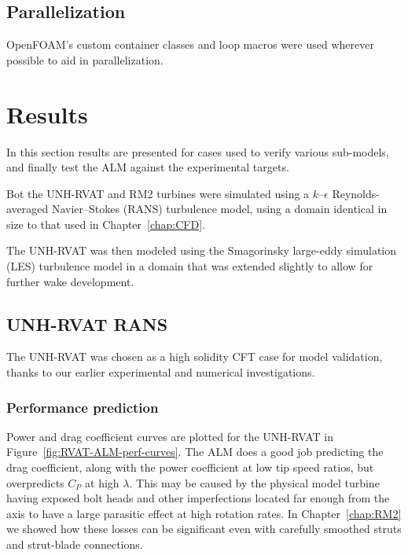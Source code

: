 \subsection{Parallelization}

OpenFOAM's custom container classes and loop macros were used wherever possible
to aid in parallelization.


\section{Results}

In this section results are presented for cases used to verify various
sub-models, and finally test the ALM against the experimental targets.


Bot the UNH-RVAT and RM2 turbines were simulated using a $k$--$\epsilon$
Reynolds-averaged Navier--Stokes (RANS) turbulence model, using a domain
identical in size to that used in Chapter~\ref{chap:CFD}.

The UNH-RVAT was then modeled using the Smagorinsky large-eddy simulation (LES)
turbulence model \cite{Smagorinsky1963} in a domain that was extended slightly
to allow for further wake development.


\subsection{UNH-RVAT RANS}

The UNH-RVAT was chosen as a high solidity CFT case for model validation, thanks
to our earlier experimental and numerical investigations.



\subsubsection{Performance prediction}

Power and drag coefficient curves are plotted for the UNH-RVAT in
Figure~\ref{fig:RVAT-ALM-perf-curves}. The ALM does a good job predicting the
drag coefficient, along with the power coefficient at low tip speed ratios, but
overpredicts $C_P$ at high $\lambda$. This may be caused by the physical model
turbine having exposed bolt heads and other imperfections located far enough
from the axis to have a large parasitic effect at high rotation rates. In
Chapter~\ref{chap:RM2} we showed how these losses can be significant even with
carefully smoothed struts and strut-blade connections.

